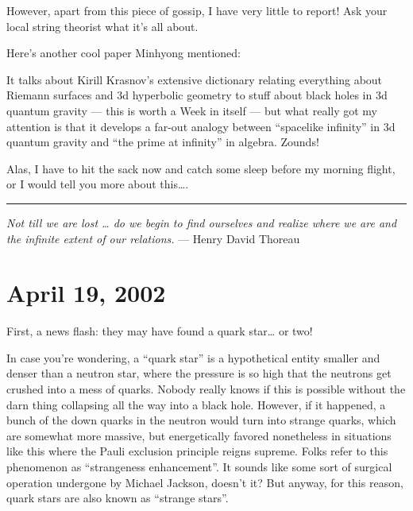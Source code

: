 \documentclass{article}
\def\tightlist{}
\renewcommand{\texttt}[1]{%
  \begingroup
  \ttfamily
  \begingroup\lccode`~=`/\lowercase{\endgroup\def~}{/\discretionary{}{}{}}%
  \begingroup\lccode`~=`[\lowercase{\endgroup\def~}{[\discretionary{}{}{}}%
  \begingroup\lccode`~=`.\lowercase{\endgroup\def~}{.\discretionary{}{}{}}%
  \catcode`/=\active\catcode`[=\active\catcode`.=\active
  \scantokens{#1\noexpand}%
  \endgroup
}
\begin{document}
However, apart from this piece of gossip, I have very little to report!
Ask your local string theorist what it's all about.

Here's another cool paper Minhyong mentioned:


It talks about Kirill Krasnov's extensive dictionary relating everything
about Riemann surfaces and 3d hyperbolic geometry to stuff about black
holes in 3d quantum gravity --- this is worth a Week in itself --- but
what really got my attention is that it develops a far-out analogy
between ``spacelike infinity'' in 3d quantum gravity and ``the prime at
infinity'' in algebra. Zounds!

Alas, I have to hit the sack now and catch some sleep before my morning
flight, or I would tell you more about this\ldots.

\begin{center}\rule{0.5\linewidth}{0.5pt}\end{center}

\emph{Not till we are lost \ldots{} do we begin to find ourselves and
realize where we are and the infinite extent of our relations.} ---
Henry David Thoreau



\hypertarget{week180}{%
\section{April 19, 2002}\label{week180}}

First, a news flash: they may have found a quark star\ldots{} or two!

In case you're wondering, a ``quark star'' is a hypothetical entity
smaller and denser than a neutron star, where the pressure is so high
that the neutrons get crushed into a mess of quarks. Nobody really knows
if this is possible without the darn thing collapsing all the way into a
black hole. However, if it happened, a bunch of the down quarks in the
neutron would turn into strange quarks, which are somewhat more massive,
but energetically favored nonetheless in situations like this where the
Pauli exclusion principle reigns supreme. Folks refer to this phenomenon
as ``strangeness enhancement''. It sounds like some sort of surgical
operation undergone by Michael Jackson, doesn't it? But anyway, for this
reason, quark stars are also known as ``strange stars''.
\end{document}
